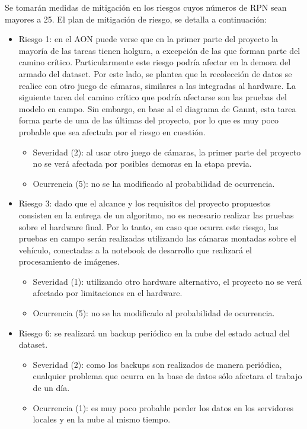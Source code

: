 \documentclass[
11pt, %
]{charter}
\begin{document}
Se tomarán medidas de mitigación en los riesgos cuyos números de RPN sean mayores a 25. El plan de mitigación de riesgo, se detalla a continuación:

\begin{itemize}

	\item Riesgo 1: en el AON puede verse que en la primer parte del proyecto la mayoría de las tareas tienen holgura, a excepción de las que forman parte del camino crítico. Particularmente este riesgo podría afectar en la demora del armado del dataset. Por este lado, se plantea que la recolección de datos se realice con otro juego de cámaras, similares a las integradas al hardware. La siguiente tarea del camino crítico que podría afectarse son las pruebas del modelo en campo. Sin embargo, en base al el diagrama de Gannt, esta tarea forma parte de una de las últimas del proyecto, por lo que es muy poco probable que sea afectada por el riesgo en cuestión.
	\begin{itemize}
		\item Severidad (2): al usar otro juego de cámaras, la primer parte del proyecto no se verá afectada por posibles demoras en la etapa previa.
		\item Ocurrencia (5): no se ha modificado al probabilidad de ocurrencia.
	\end{itemize}
	
	\item Riesgo 3: dado que el alcance y los requisitos del proyecto propuestos consisten en la entrega de un algoritmo, no es necesario realizar las pruebas sobre el hardware final. Por lo tanto, en caso que ocurra este riesgo, las pruebas en campo serán realizadas utilizando las cámaras montadas sobre el vehículo, conectadas a la notebook de desarrollo que realizará el procesamiento de imágenes.
	\begin{itemize}
		\item Severidad (1): utilizando otro hardware alternativo, el proyecto no se verá afectado por limitaciones en el hardware.
		\item Ocurrencia (5): no se ha modificado al probabilidad de ocurrencia.
	\end{itemize}
	
	\item Riesgo 6: se realizará un backup periódico en la nube del estado actual del dataset.
	\begin{itemize}
		\item Severidad (2): como los backups son realizados de manera periódica, cualquier problema que ocurra en la base de datos sólo afectara el trabajo de un día.
		\item Ocurrencia (1): es muy poco probable perder los datos en los servidores locales y en la nube al mismo tiempo.
	\end{itemize}
\end{itemize}
\end{document}
